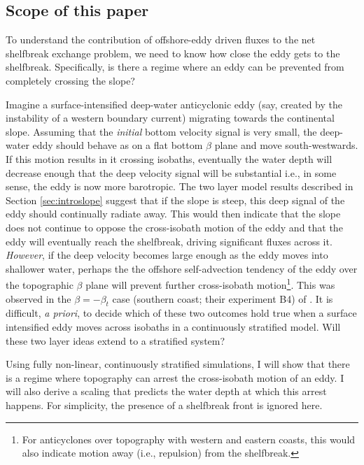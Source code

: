 \subsection{Scope of this paper}
\label{sec-1-5}
To understand the contribution of offshore-eddy driven fluxes to the net shelfbreak exchange problem, we need to know how close the eddy gets to the shelfbreak. Specifically, is there a regime where an eddy can be prevented from completely crossing the slope?

Imagine a surface-intensified deep-water anticyclonic eddy (say, created by the instability of a western boundary current) migrating towards the continental slope. Assuming that the \emph{initial} bottom velocity signal is very small, the deep-water eddy should behave as on a flat bottom $β$ plane and move south-westwards. If this motion results in it crossing isobaths, eventually the water depth will decrease enough that the deep velocity signal will be substantial i.e., in some sense, the eddy is now more barotropic. The two layer model results described in Section \ref{sec:introslope} suggest that if the slope is steep, this deep signal of the eddy should continually radiate away. This would then indicate that the slope does not continue to oppose the cross-isobath motion of the eddy and that the eddy will eventually reach the shelfbreak, driving significant fluxes across it. \emph{However}, if the deep velocity becomes large enough as the eddy moves into shallower water, perhaps the the offshore self-advection tendency of the eddy over the topographic $β$ plane will prevent further cross-isobath motion\footnote{For anticyclones over topography with western and eastern coasts, this would also indicate motion away (i.e., repulsion) from the shelfbreak.}. This was observed in the $β=-β_t$ case (southern coast; their experiment B4) of \citet{Jacob2002}. It is difficult, \emph{a priori}, to decide which of these two outcomes hold true when a surface intensified eddy moves across isobaths in a continuously stratified model. Will these two layer ideas extend to a stratified system?

Using fully non-linear, continuously stratified simulations, I will show that there is a regime where topography can arrest the cross-isobath motion of an eddy. I will also derive a scaling that predicts the water depth at which this arrest happens. For simplicity, the presence of a shelfbreak front is ignored here.

